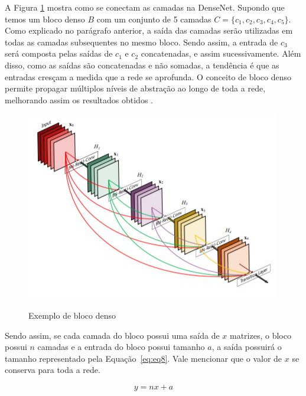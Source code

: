 A Figura \ref{fig:blocodenso} mostra como se conectam as camadas na \ac{DenseNet}. Supondo que temos um bloco denso $B$ com um conjunto de 5 camadas $C = \{c_1, c_2, c_3, c_4, c_5\}$. Como explicado no parágrafo anterior, a saída das camadas serão utilizadas em todas as camadas subsequentes no mesmo bloco. Sendo assim, a entrada de $c_3$ será composta pelas saídas de $c_1$ e $c_2$ concatenadas, e assim sucessivamente. Além disso, como as saídas são concatenadas e não somadas, a tendência é que as entradas cresçam a medida que a rede se aprofunda. O conceito de bloco denso permite propagar múltiplos níveis de abstração ao longo de toda a rede, melhorando assim os resultados obtidos \cite{liu-2017}.

\begin{figure}[t]
	\setlength{\abovecaptionskip}{0pt}
	\setlength{\belowcaptionskip}{0pt}
	\caption[Exemplo de bloco denso]{Exemplo de bloco denso}
	\centering
	\includegraphics[width=.5\textwidth]{imagem/0x_densenet_block.jpg}
	\captionsetup{justification=centering}
	\label{fig:blocodenso}
\end{figure} 

Sendo assim, se cada camada do bloco possui uma saída de $x$ matrizes, o bloco possui $n$ camadas e a entrada do bloco possui tamanho $a$, a saída possuirá o tamanho representado pela Equação~\ref{eq:eq8}. Vale mencionar que o valor de $x$ se conserva para toda a rede.

\begin{equation}
	\label{eq:eq8}	y = n x + a
\end{equation}

